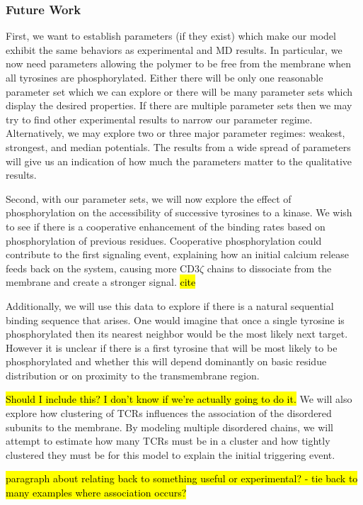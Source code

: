 \documentclass[../../AdvancementSummary.tex]{subfiles}
\begin{document}
\subsubsection{Future Work}

First, we want to establish parameters (if they exist) which make our model exhibit the same behaviors as experimental and MD results. In particular, we now need parameters allowing the polymer to be free from the membrane when all tyrosines are phosphorylated. Either there will be only one reasonable parameter set which we can explore or there will be many parameter sets which display the desired properties.  If there are multiple parameter sets then we may try to find other experimental results to narrow our parameter regime. Alternatively, we may explore two or three major parameter regimes: weakest, strongest, and median potentials. The results from a wide spread of parameters will give us an indication of how much the parameters matter to the qualitative results.  

Second, with our parameter sets, we will now explore the effect of phosphorylation on the accessibility of successive tyrosines to a kinase.  We wish to see if there is a cooperative enhancement of the binding rates based on phosphorylation of previous residues.  Cooperative phosphorylation could contribute to the first signaling event, explaining how an initial calcium release feeds back on the system, causing more CD3$\zeta$ chains to dissociate from the membrane and create a stronger signal. \hl{cite}

Additionally, we will use this data to explore if there is a natural sequential binding sequence that arises.  One would imagine that once a single tyrosine is phosphorylated then its nearest neighbor would be the most likely next target.  However it is unclear if there is a first tyrosine that will be most likely to be phosphorylated and whether this will depend dominantly on basic residue distribution or on proximity to the transmembrane region. 

\hl{Should I include this?  I don't know if we're actually going to do it.}
We will also explore how clustering of TCRs influences the association of the disordered subunits to the membrane. By modeling multiple disordered chains, we will attempt to estimate how many TCRs must be in a cluster and how tightly clustered they must be for this model to explain the initial triggering event.

\hl{paragraph about relating back to something useful or experimental? - tie back to many examples where association occurs?}
\end{document}
